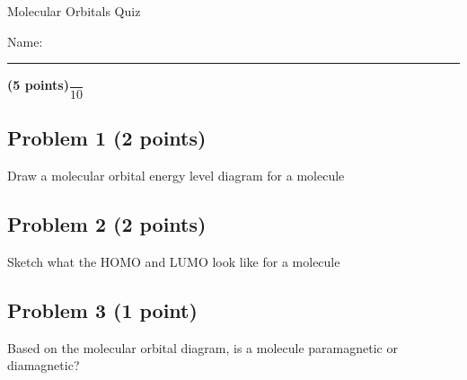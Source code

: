 \documentclass[12pt, letterpaper]{memoir}
\begin{document}
	\begin{center}
		{\large Molecular Orbitals Quiz}
	\end{center}
	{\large Name: \rule[-1mm]{4in}{.1pt} {\bfseries (5 points)}\hspace{4em}$\dfrac{~}{10}$} 
	
	\subsection*{Problem 1 (2 points)}
	Draw a molecular orbital energy level diagram for a  molecule
	
	\vspace{22em}
	\subsection*{Problem 2 (2 points)}
	Sketch what the HOMO and LUMO look like for a  molecule
	
	\vspace{10em}
	\subsection*{Problem 3 (1 point)}
	Based on the molecular orbital diagram, is a  molecule paramagnetic or diamagnetic?
	
\end{document}
